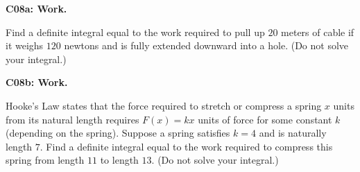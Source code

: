 \documentclass[12pt]{article}
\newcommand{\<}{\left\langle}
\renewcommand{\>}{\right\rangle}
\newcommand{\exerciseHeader}[4]{


  \vspace{0.5em}
  \textbf{#2}
  \vspace{0.5em}

}
\begin{document}
\begin{multicols}{2}
%

%

\exerciseHeader{2017 June 29}{C08a: Work.}{
Express the work done in a system as a definite integral.
}{4/4}
%
Find a definite integral equal to the work required to pull up \(20\) meters
of cable if it weighs \(120\) newtons and is fully extended downward into
a hole.
(Do not solve your integral.)

\exerciseHeader{2017 June 29}{C08b: Work.}{
Express the work done in a system as a definite integral.
}{4/4}

Hooke's Law states that the force required to stretch or
compress a spring \(x\) units
from its natural length requires \(F(x)=kx\) units of force for some
constant \(k\) (depending on the spring). Suppose a spring satisfies
\(k=4\) and is naturally length \(7\). Find a definite integral equal
to the work required to compress
this spring from length \(11\) to length \(13\).
(Do not solve your integral.)



%


\end{multicols}
\end{document}
